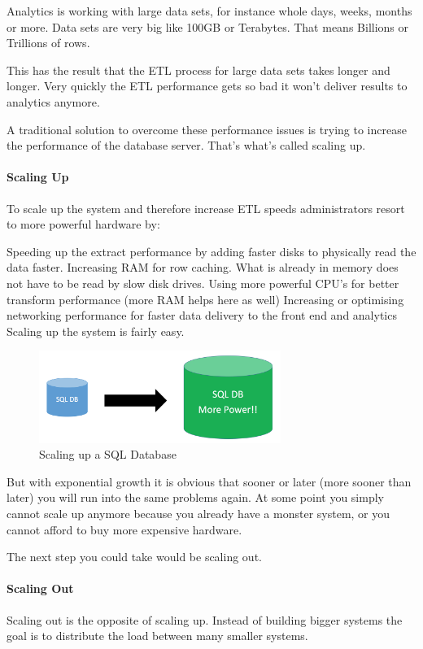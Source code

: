 \documentclass[12pt]{scrartcl} %
\begin{document}
Analytics is working with large data sets, for instance whole days, weeks, months or more. Data sets are very big like 100GB or Terabytes. That means Billions or Trillions of rows.

This has the result that the ETL process for large data sets takes longer and longer. Very quickly the ETL performance gets so bad it won’t deliver results to analytics anymore.

A traditional solution to overcome these performance issues is trying to increase the performance of the database server. That’s what’s called scaling up.

\paragraph{Scaling Up}
To scale up the system and therefore increase ETL speeds administrators resort to more powerful hardware by:

Speeding up the extract performance by adding faster disks to physically read the data faster.
Increasing RAM for row caching. What is already in memory does not have to be read by slow disk drives.
Using more powerful CPU’s for better transform performance (more RAM helps here as well)
Increasing or optimising networking performance for faster data delivery to the front end and analytics
Scaling up the system is fairly easy.

\begin{figure}[htbp]
  \centering
     \includegraphics[width=0.7\textwidth]{images/SQL-Scaling-UP}
  \caption{Scaling up a SQL Database}
  \label{fig:Bild1}
\end{figure}

But with exponential growth it is obvious that sooner or later (more sooner than later) you will run into the same problems again. At some point you simply cannot scale up anymore because you already have a monster system, or you cannot afford to buy more expensive hardware.

The next step you could take would be scaling out.

\paragraph{Scaling Out}
Scaling out is the opposite of scaling up. Instead of building bigger systems the goal is to distribute the load between many smaller systems.
\end{document}
